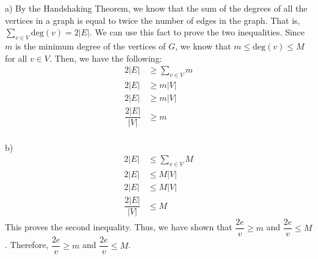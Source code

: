 \documentclass[12pt]{exam}
\begin{document}
\begin{solution}

	a) By the Handshaking Theorem, we know that the sum of the degrees of all the vertices in a graph is equal to twice the number of edges in the graph. That is, $\sum_{v \in V} \text{deg}(v) = 2|E|$. We can use this fact to prove the two inequalities.
	Since $m$ is the minimum degree of the vertices of $G$, we know that $m \leq \text{deg}(v) \leq M$ for all $v \in V$. Then, we have the following:
	\begin{align*}
		2|E|              & \geq \sum_{v \in V} m \\
		2|E|              & \geq m|V|             \\
		2|E|              & \geq m|V|             \\
		\dfrac{2|E|}{|V|} & \geq m
	\end{align*}
	\\b)
	\begin{align*}
		2|E|              & \leq \sum_{v \in V} M \\
		2|E|              & \leq M|V|             \\
		2|E|              & \leq M|V|             \\
		\dfrac{2|E|}{|V|} & \leq M
	\end{align*}
	This proves the second inequality. Thus, we have shown that $\dfrac{2e}{v} \geq m$ and $\dfrac{2e}{v} \leq M$.
	Therefore, $\dfrac{2e}{v} \geq m$ and $\dfrac{2e}{v} \leq M$.
\end{solution}
\end{document}
